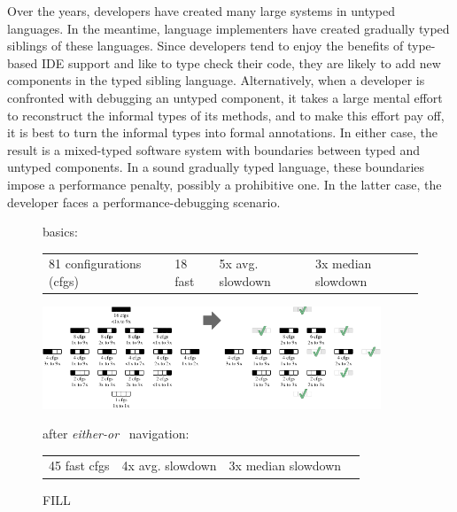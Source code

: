 
Over the years, developers have created many large systems in untyped languages.
In the meantime, language implementers have created gradually typed siblings of
these languages.  Since developers tend to enjoy the benefits of type-based IDE
support and like to type check their code, they are likely to add new components
in the typed sibling language. Alternatively, when a developer is confronted
with debugging an untyped component, it takes a large mental effort to
reconstruct the informal types of its methods, and to make this effort pay off,
it is best to turn the informal types into formal annotations. In either case,
the result is a mixed-typed software system with boundaries between typed and
untyped components. In a sound gradually typed language, these boundaries impose
a performance penalty, possibly a prohibitive one. In the latter case, the
developer faces a performance-debugging scenario.

\begin{figure}[htb]

     basics:
    \begin{tabular}{llll}
      81 configurations (cfgs) &
      18 fast &
      5x avg. slowdown &
      3x median slowdown
    \end{tabular}

    \bigskip

    \includegraphics[width=0.9\textwidth]{data/fsm-lattice.pdf}

    after \emph{either-or}~\cite{g-deep-shallow} navigation:
    \begin{tabular}{llll}
      45 fast cfgs &
      4x avg. slowdown &
      3x median slowdown
    \end{tabular}

  \caption{FILL}
  \label{f:fsm-seascape}
\end{figure}

